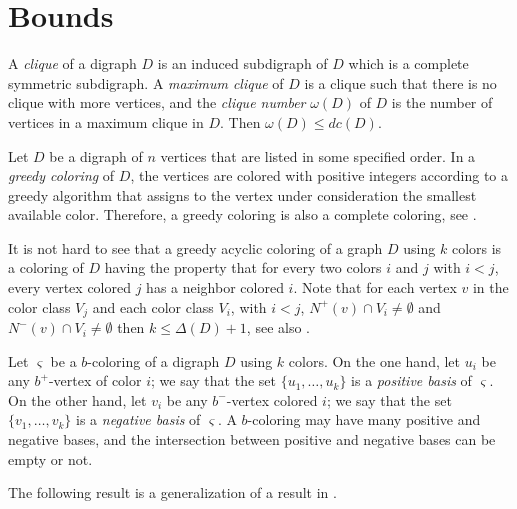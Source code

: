 \documentclass[12pt]{article}
\begin{document}

\section{Bounds}\label{section2}

A \textit{clique} of a digraph $D$ is an induced subdigraph of $D$ which is a complete symmetric subdigraph. A \textit{maximum clique} of $D$ is a clique such that there is no clique with more vertices, and the \textit{clique number} $\omega(D)$ of $D$ is the number of vertices in a maximum clique in $D$. Then $\omega(D)\leq dc(D)$.

Let $D$ be a digraph of $n$ vertices that are listed in some specified order. In a \emph{greedy coloring} of $D$, the vertices are colored with positive integers according to a greedy algorithm that assigns to the vertex under consideration the smallest available color. Therefore, a greedy coloring is also a complete coloring, see \cite{MR3875016,MR4426060}.

It is not hard to see that a greedy acyclic coloring of a graph $D$ using $k$ colors is a coloring of $D$ having the property that for every two colors $i$ and $j$ with $i<j$, every vertex colored $j$ has a neighbor colored $i$. Note that for each vertex $v$ in the color class $V_j$ and each color class $V_i$, with $i<j$, $N^+(v)\cap V_i\not=\emptyset$ and $N^-(v)\cap V_i\not=\emptyset$ then $k \leq \Delta(D)+1$, see also \cite{MR4426060}.

Let $\varsigma$ be a $b$-coloring of a digraph $D$ using $k$ colors. On the one hand, let $u_i$ be any $b^+$-vertex of color $i$; we say that the set $\{u_1,\dots,u_k\}$ is a \textit{positive basis} of $\varsigma$. On the other hand, let $v_i$ be any $b^-$-vertex colored $i$; we say that the set $\{v_1,\dots,v_k\}$ is a \textit{negative basis} of $\varsigma$. A $b$-coloring may have many positive and negative bases, and the intersection between positive and negative bases can be empty or not.

The following result is a generalization of a result in \cite{MR1927071}.
\end{document}
